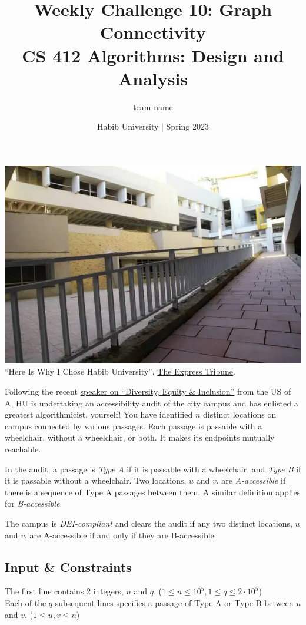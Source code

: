 \documentclass[a4paper]{exam}
\title{Weekly Challenge 10: Graph Connectivity\\CS 412 Algorithms: Design and Analysis}
\author{team-name}  %
\date{Habib University | Spring 2023}
\begin{document}
\maketitle

\begin{questions}

  


  \begin{center}
    \includegraphics[width=.7\textwidth]{ramp}\\
    \small ``Here Is Why I Chose Habib University'', \href{https://tribune.com.pk/article/22246/here-is-why-i-chose-habib-university}{The Express Tribune}.
  \end{center}

  Following the recent \href{https://www.facebook.com/karachi.usconsulate/posts/pfbid0sb9UC6H9KPnS7fmHSpNQiHQrzXDAFhRKwWRiLD7tjDwQpyuUQKrm6vXfYH2xYUG9l}{speaker on ``Diversity, Equity \& Inclusion''} from the US of A, HU is undertaking an accessibility audit of the city campus and has enlisted a greatest algorithmicist, yourself! You have identified $n$ distinct locations on campus connected by various passages. Each passage is passable with a wheelchair, without a wheelchair, or both. It makes its endpoints mutually reachable.

  In the audit, a passage is \textit{Type A} if it is passable with a wheelchair, and \textit{Type B} if it is passable without a wheelchair. Two locations, $u$ and $v$, are \textit{A-accessible} if there is a sequence of Type A passages between them. A similar definition applies for \textit{B-accessible}.

  The campus is \textit{DEI-compliant} and clears the audit if any two distinct locations, $u$ and $v$, are A-accessible if and only if they are B-accessible.

  \subsection*{Input \& Constraints}
  The first line contains 2 integers, $n$ and $q$. ($1\leq n \leq 10^5, 1\leq q \leq 2\cdot 10^5$)
  \\
  Each of the $q$ subsequent lines specifies a passage of Type A or Type B between $u$ and $v$. ($1\leq u,v \leq n$)
  

\end{questions}
\end{document}
